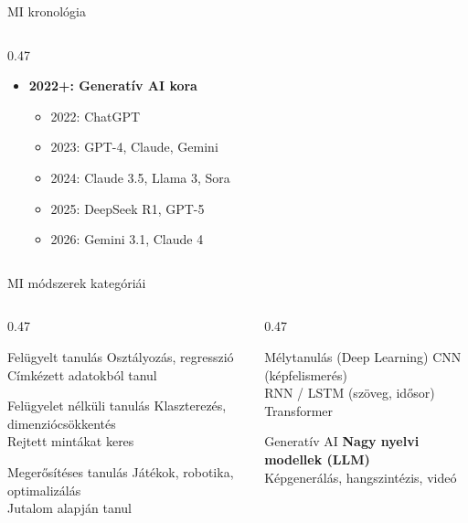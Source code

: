\documentclass[aspectratio=169, 12pt]{beamer}
\begin{document}
\begin{frame}{MI kronológia}
\begin{columns}[T,onlytextwidth]
\begin{column}{0.47\textwidth}
\begin{itemize}
        \item \textbf{2022+: Generatív AI kora}
          \begin{itemize}\setlength{\itemsep}{1pt}
            \item 2022: ChatGPT
            \item 2023: GPT-4, Claude, Gemini
            \item 2024: Claude 3.5, Llama 3, Sora
            \item 2025: DeepSeek R1, GPT-5
            \item 2026: Gemini 3.1, Claude 4
          \end{itemize}
      \end{itemize}
    \end{column}
  \end{columns}
\end{frame}

\begin{frame}{MI módszerek kategóriái}
  \footnotesize
  \begin{columns}[T,onlytextwidth]
    \begin{column}{0.47\textwidth}
      \begin{block}{Felügyelt tanulás}
        Osztályozás, regresszió\\
        {\small\color{gray} Címkézett adatokból tanul}
      \end{block}
      \begin{block}{Felügyelet nélküli tanulás}
        Klaszterezés, dimenziócsökkentés\\
        {\small\color{gray} Rejtett mintákat keres}
      \end{block}
      \begin{block}{Megerősítéses tanulás}
        Játékok, robotika, optimalizálás\\
        {\small\color{gray} Jutalom alapján tanul}
      \end{block}
    \end{column}
    \begin{column}{0.47\textwidth}
      \begin{block}{Mélytanulás (Deep Learning)}
        CNN (képfelismerés)\\
        RNN / LSTM (szöveg, idősor)\\
        Transformer
      \end{block}
      \begin{alertblock}{Generatív AI}
        \textbf{Nagy nyelvi modellek (LLM)}\\
        Képgenerálás, hangszintézis, videó
      \end{alertblock}
    \end{column}
  \end{columns}
\end{frame}
\end{document}

